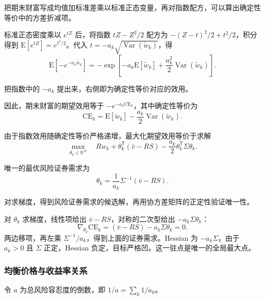 把期末财富写成均值加标准差乘以标准正态变量，再对指数配方，可以算出确定性等价中的方差折减项。

\begin{solution}[label-content={证明（CARA 效用的确定性等价）},blank-type=none]
标准正态密度乘以 $e^{tZ}$ 后，将指数 $tZ-Z^2/2$ 配方为 $-(Z-t)^2/2+t^2/2$，积分得到 $\mathrm E[e^{tZ}]=e^{t^2/2}$。代入 $t=-a_k\sqrt{\operatorname{Var}(\widetilde w_k)}$，得
\[
 \mathrm E[-e^{-a_k\widetilde w_k}]
 =-\exp\left[-a_k\mathrm E[\widetilde w_k]
 +\frac{a_k^2}{2}\operatorname{Var}(\widetilde w_k)\right].
\]

把指数中的 $-a_k$ 提出来，右侧即为确定性等价对应的效用。
\end{solution}

因此，期末财富的期望效用等于 $-e^{-a_k\mathrm{CE}_k}$，其中确定性等价为
\begin{equation*}
 \mathrm{CE}_k=\mathrm E[\widetilde w_k]-\frac{a_k}{2}\operatorname{Var}(\widetilde w_k).
 \tag{13.III}\label{eq:wj-13-normal-ce}
\end{equation*}

由于指数效用随确定性等价严格递增，最大化期望效用等价于求解
\[
 \max_{\theta_k\in\mathbb R^N}\quad
 Rw_k+\theta_k^{\mathsf T}(\bar v-RS)
 -\frac{a_k}{2}\theta_k^{\mathsf T}\Sigma\theta_k.
\]

唯一的最优风险证券需求为
\begin{equation*}
 \theta_k=\frac1{a_k}\Sigma^{-1}(\bar v-RS).
 \tag{13.IV}\label{eq:wj-13-normal-demand}
\end{equation*}

对求梯度，得到风险证券需求的候选解，再用协方差矩阵的正定性验证唯一性。

\begin{solution}[label-content={证明（个人证券需求）},blank-type=none]
对 $\theta_k$ 求梯度，线性项给出 $\bar v-RS$，对称的二次型给出 $-a_k\Sigma\theta_k$：
\[
 \nabla_{\theta_k}\mathrm{CE}_k=(\bar v-RS)-a_k\Sigma\theta_k=0.
\]
两边移项，再左乘 $\Sigma^{-1}/a_k$，得到上面的证券需求。Hessian 为 $-a_k\Sigma$，由于 $a_k>0$ 且 $\Sigma$ 正定，Hessian 负定，目标严格凹。这一驻点是唯一的全局最大点。
\end{solution}

\subsubsection{均衡价格与收益率关系}
令 $a$ 为总风险容忍度的倒数，即 $1/a=\sum_k1/a_k$。

